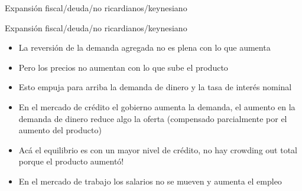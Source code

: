 \documentclass{beamer}
\begin{document}
\begin{frame}{Expansión fiscal/deuda/no ricardianos/keynesiano}
\begin{center}
\begin{figure}[H]
\begin{center}
\begin{minipage}[b]{0.45\textwidth}
\begin{center}
\end{center}
\end{minipage}
\end{center}
\end{figure}
\end{center}
\end{frame}


\begin{frame}{Expansión fiscal/deuda/no ricardianos/keynesiano}
   
\begin{itemize}
\item La reversión de la demanda agregada no es plena con lo que aumenta 
\item Pero los precios no aumentan con lo que sube el producto
\item Esto empuja para arriba la demanda de dinero y la tasa de interés nominal
\item En el mercado de crédito el gobierno aumenta la demanda, el aumento en la demanda de dinero reduce algo la oferta (compensado parcialmente por el aumento del producto) 
\item Acá el equilibrio es con un mayor nivel de crédito, no hay crowding out total porque el producto aumentó! 
\item En el mercado de trabajo los salarios no se mueven y aumenta el empleo  
\end{itemize}
\end{frame}
\end{document}
